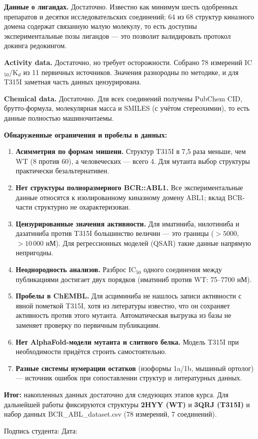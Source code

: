 \documentclass[11pt,a4paper]{article}
\newcommand{\code}[1]{{\ttfamily #1}}
\begin{document}
\textbf{Данные о лигандах.} Достаточно. Известно как минимум шесть одобренных препаратов
и десятки исследовательских соединений; 64 из 68 структур киназного домена содержат
связанную малую молекулу, то есть доступны экспериментальные позы лигандов --- это
позволит валидировать протокол докинга редокингом.

\textbf{Activity data.} Достаточно, но требует осторожности. Собрано 78 измерений
IC$_{50}$/K$_d$ из 11 первичных источников. Значения разнородны по методике, и для T315I
заметная часть данных цензурирована.

\textbf{Chemical data.} Достаточно. Для всех соединений получены PubChem CID,
брутто-формула, молекулярная масса и SMILES (с учётом стереохимии), то есть данные
полностью машиночитаемы.

\textbf{Обнаруженные ограничения и пробелы в данных:}
\begin{enumerate}[leftmargin=*,topsep=2pt,itemsep=3pt]
\item \textbf{Асимметрия по формам мишени.} Структур T315I в 7{,}5 раза меньше, чем WT
(8 против 60), а человеческих --- всего 4. Для мутанта выбор структуры практически
безальтернативен.
\item \textbf{Нет структуры полноразмерного BCR::ABL1.} Все экспериментальные данные
относятся к изолированному киназному домену ABL1; вклад BCR-части структурно не
охарактеризован.
\item \textbf{Цензурированные значения активности.} Для иматиниба, нилотиниба и
дазатиниба против T315I большинство величин --- это границы ($>5000$, $>10\,000$ нМ).
Для регрессионных моделей (QSAR) такие данные напрямую непригодны.
\item \textbf{Неоднородность анализов.} Разброс IC$_{50}$ одного соединения между
публикациями достигает двух порядков (иматиниб против WT: 75--7700 нМ).
\item \textbf{Пробелы в ChEMBL.} Для асциминиба не нашлось записи активности с явной
пометкой T315I, хотя из литературы известно, что он сохраняет активность против этого
мутанта. Автоматическая выгрузка из базы не заменяет проверку по первичным публикациям.
\item \textbf{Нет AlphaFold-модели мутанта и слитного белка.} Модель T315I при
необходимости придётся строить самостоятельно.
\item \textbf{Разные системы нумерации остатков} (изоформы 1a/1b, мышиный ортолог) ---
источник ошибок при сопоставлении структур и литературных данных.
\end{enumerate}

\textbf{Итог:} накопленных данных достаточно для следующих этапов курса. Для дальнейшей
работы фиксируются структуры \textbf{2HYY (WT)} и \textbf{3QRJ (T315I)} и набор данных
\code{BCR\_ABL\_dataset.csv} (78 измерений, 7 соединений).

\vspace{1.2cm}

\noindent Подпись студента: \underline{\hspace{5cm}} \hfill
Дата: \underline{\hspace{3.5cm}}
\end{document}
